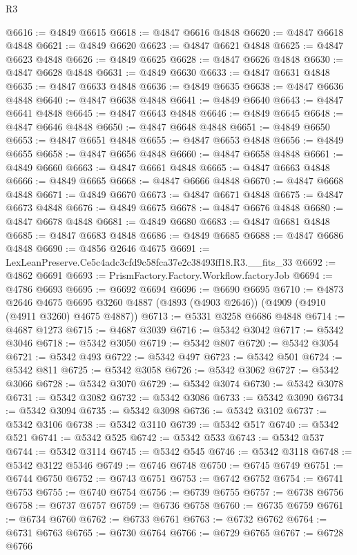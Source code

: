 \begin{lexlean}{R3}
\begin{coremodule}
@6616 := @4849 @6615
@6618 := @4847 @6616 @4848
@6620 := @4847 @6618 @4848
@6621 := @4849 @6620
@6623 := @4847 @6621 @4848
@6625 := @4847 @6623 @4848
@6626 := @4849 @6625
@6628 := @4847 @6626 @4848
@6630 := @4847 @6628 @4848
@6631 := @4849 @6630
@6633 := @4847 @6631 @4848
@6635 := @4847 @6633 @4848
@6636 := @4849 @6635
@6638 := @4847 @6636 @4848
@6640 := @4847 @6638 @4848
@6641 := @4849 @6640
@6643 := @4847 @6641 @4848
@6645 := @4847 @6643 @4848
@6646 := @4849 @6645
@6648 := @4847 @6646 @4848
@6650 := @4847 @6648 @4848
@6651 := @4849 @6650
@6653 := @4847 @6651 @4848
@6655 := @4847 @6653 @4848
@6656 := @4849 @6655
@6658 := @4847 @6656 @4848
@6660 := @4847 @6658 @4848
@6661 := @4849 @6660
@6663 := @4847 @6661 @4848
@6665 := @4847 @6663 @4848
@6666 := @4849 @6665
@6668 := @4847 @6666 @4848
@6670 := @4847 @6668 @4848
@6671 := @4849 @6670
@6673 := @4847 @6671 @4848
@6675 := @4847 @6673 @4848
@6676 := @4849 @6675
@6678 := @4847 @6676 @4848
@6680 := @4847 @6678 @4848
@6681 := @4849 @6680
@6683 := @4847 @6681 @4848
@6685 := @4847 @6683 @4848
@6686 := @4849 @6685
@6688 := @4847 @6686 @4848
@6690 := @4856 @2646 @4675
@6691 := LexLeanPreserve.Ce5c4adc3cfd9c58fca37e2c38493ff18.R3.__fits_33
@6692 := @4862 @6691
@6693 := PrismFactory.Factory.Workflow.factoryJob
@6694 := @4786 @6693
@6695 := @6692 @6694
@6696 := @6690 @6695
@6710 := @4873
    @2646
    @4675
    @6695
    @3260
    @4887
    (@4893 (@4903 @2646))
    (@4909 (@4910 (@4911 @3260) @4675 @4887))
@6713 := @5331 @3258 @6686 @4848
@6714 := @4687 @1273
@6715 := @4687 @3039
@6716 := @5342 @3042
@6717 := @5342 @3046
@6718 := @5342 @3050
@6719 := @5342 @807
@6720 := @5342 @3054
@6721 := @5342 @493
@6722 := @5342 @497
@6723 := @5342 @501
@6724 := @5342 @811
@6725 := @5342 @3058
@6726 := @5342 @3062
@6727 := @5342 @3066
@6728 := @5342 @3070
@6729 := @5342 @3074
@6730 := @5342 @3078
@6731 := @5342 @3082
@6732 := @5342 @3086
@6733 := @5342 @3090
@6734 := @5342 @3094
@6735 := @5342 @3098
@6736 := @5342 @3102
@6737 := @5342 @3106
@6738 := @5342 @3110
@6739 := @5342 @517
@6740 := @5342 @521
@6741 := @5342 @525
@6742 := @5342 @533
@6743 := @5342 @537
@6744 := @5342 @3114
@6745 := @5342 @545
@6746 := @5342 @3118
@6748 := @5342 @3122 @5346
@6749 := @6746 @6748
@6750 := @6745 @6749
@6751 := @6744 @6750
@6752 := @6743 @6751
@6753 := @6742 @6752
@6754 := @6741 @6753
@6755 := @6740 @6754
@6756 := @6739 @6755
@6757 := @6738 @6756
@6758 := @6737 @6757
@6759 := @6736 @6758
@6760 := @6735 @6759
@6761 := @6734 @6760
@6762 := @6733 @6761
@6763 := @6732 @6762
@6764 := @6731 @6763
@6765 := @6730 @6764
@6766 := @6729 @6765
@6767 := @6728 @6766

\end{coremodule}
\end{lexlean}
